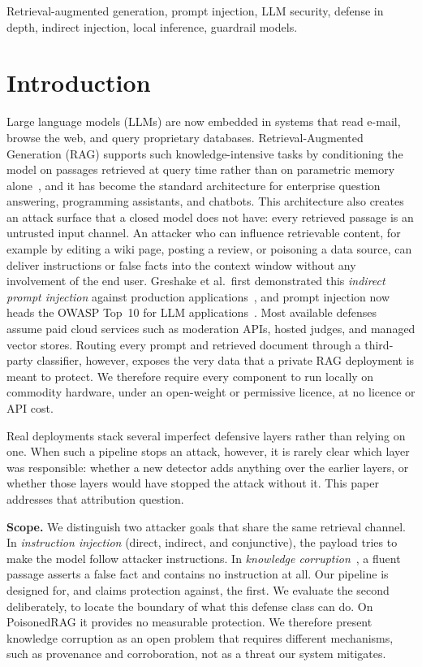 \documentclass[conference]{IEEEtran}
\begin{document}
\begin{IEEEkeywords}
Retrieval-augmented generation, prompt injection, LLM security, defense in depth, indirect injection, local inference, guardrail models.
\end{IEEEkeywords}

\section{Introduction}
Large language models (LLMs) are now embedded in systems that read e-mail, browse the web, and query proprietary databases. Retrieval-Augmented Generation (RAG) supports such knowledge-intensive tasks by conditioning the model on passages retrieved at query time rather than on parametric memory alone~\cite{lewis2020rag}, and it has become the standard architecture for enterprise question answering, programming assistants, and chatbots. This architecture also creates an attack surface that a closed model does not have: every retrieved passage is an untrusted input channel. An attacker who can influence retrievable content, for example by editing a wiki page, posting a review, or poisoning a data source, can deliver instructions or false facts into the context window without any involvement of the end user. Greshake et al.\ first demonstrated this \emph{indirect prompt injection} against production applications~\cite{greshake2023}, and prompt injection now heads the OWASP Top~10 for LLM applications~\cite{owasp2025}. Most available defenses assume paid cloud services such as moderation APIs, hosted judges, and managed vector stores. Routing every prompt and retrieved document through a third-party classifier, however, exposes the very data that a private RAG deployment is meant to protect. We therefore require every component to run locally on commodity hardware, under an open-weight or permissive licence, at no licence or API cost.

Real deployments stack several imperfect defensive layers rather than relying on one. When such a pipeline stops an attack, however, it is rarely clear which layer was responsible: whether a new detector adds anything over the earlier layers, or whether those layers would have stopped the attack without it. This paper addresses that attribution question.

\textbf{Scope.} We distinguish two attacker goals that share the same retrieval channel. In \emph{instruction injection} (direct, indirect, and conjunctive), the payload tries to make the model follow attacker instructions. In \emph{knowledge corruption}~\cite{zou2025poisonedrag}, a fluent passage asserts a false fact and contains no instruction at all. Our pipeline is designed for, and claims protection against, the first. We evaluate the second deliberately, to locate the boundary of what this defense class can do. On PoisonedRAG it provides no measurable protection. We therefore present knowledge corruption as an open problem that requires different mechanisms, such as provenance and corroboration, not as a threat our system mitigates.
\end{document}
